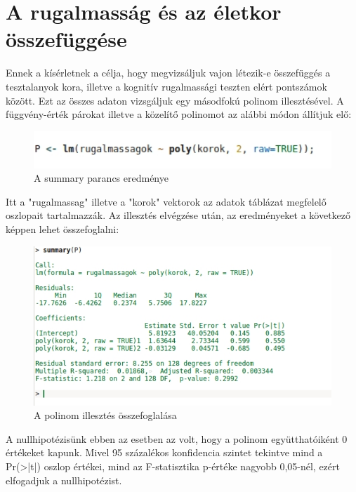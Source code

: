 \documentclass[oneside,titlepage,12pt,a4paper]{report}
\begin{document}
\section*{A rugalmasság és az életkor összefüggése}

Ennek a kísérletnek a célja, hogy megvizsáljuk vajon létezik-e összefüggés a tesztalanyok kora, illetve a kognitív rugalmassági teszten elért pontszámok között. Ezt az összes adaton vizsgáljuk egy másodfokú polinom illesztésével. A függvény-érték párokat illetve a közelítő polinomot az alábbi módon állítjuk elő:

\begin{figure}[H]
\begin{center}
  \includegraphics[width=150mm]{./Abrak/policsinal.jpg}
  \caption{A summary parancs eredménye}
\end{center}
\end{figure}

Itt a "rugalmassag" illetve a "korok" vektorok az adatok táblázat megfelelő oszlopait tartalmazzák. Az illesztés elvégzése után, az eredményeket a következő képpen lehet összefoglalni:

\begin{figure}[H]
\begin{center}
  \includegraphics[width=150mm]{./Abrak/polipocs.jpg}
  \caption{A polinom illesztés összefoglalása}
\end{center}
\end{figure}

A nullhipotézisünk ebben az esetben az volt, hogy a polinom együtthatóiként 0 értékeket kapunk. Mivel 95 százalékos konfidencia szintet tekintve mind a  Pr(>|t|)   oszlop   értékei, mind az F-statisztika   p-értéke nagyobb 0,05-nél, ezért elfogadjuk a nullhipotézist. 
\end{document}
